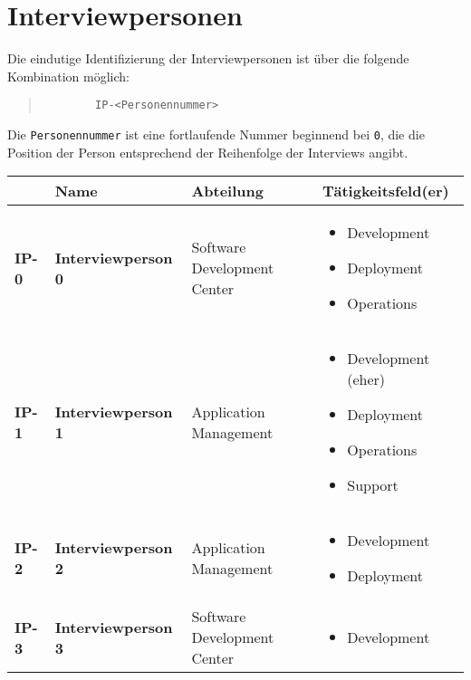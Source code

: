\section{Interviewpersonen}
\label{sec:AA-02_interview-persons}

Die eindutige Identifizierung der Interviewpersonen ist über die folgende Kombination möglich:

\begin{quote}
    \begin{verbatim}
        IP-<Personennummer>
    \end{verbatim}
\end{quote}

Die \texttt{Personennummer} ist eine fortlaufende Nummer beginnend bei \texttt{0}, die die Position der Person entsprechend der Reihenfolge der Interviews angibt.

\begin{longtable}{  |   >{\bfseries}p{}                  %
                        >{\raggedright\bfseries}p{}      %
                    |   >{\raggedright}p{}               %
                    |    p{}                             %
                    | }
    \hline
        & \upshape\textbf{Name} 
        & \upshape\textbf{Abteilung} 
        & \upshape\textbf{Tätigkeitsfeld(er)} \\
    \hline \hline
    \endhead
    \hline
        IP-0
        & Interviewperson 0
        & Software Development Center
        & 
        \begin{itemize}
            \item Development
            \item Deployment
            \item Operations
        \end{itemize} \\
    \hline
        IP-1
        & Interviewperson 1
        & Application Management
        & 
        \begin{itemize}
            \item Development (eher)
            \item Deployment
            \item Operations
            \item Support
        \end{itemize} \\
    \hline
        IP-2
        & Interviewperson 2
        & Application Management
        & 
        \begin{itemize}
            \item Development
            \item Deployment
        \end{itemize} \\
    \hline
        IP-3
        & Interviewperson 3
        & Software Development Center
        & 
        \begin{itemize}
            \item Development
        \end{itemize} \\
    \hline
\end{longtable}
